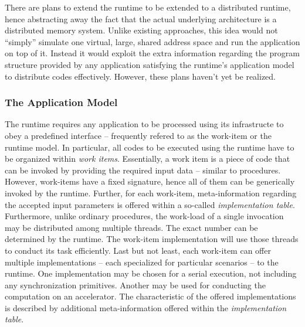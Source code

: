 There
are plans to extend the runtime to be extended to a distributed runtime, hence
abstracting away the fact that the actual underlying architecture is a
distributed memory system. Unlike existing approaches, this idea would not
``simply'' simulate one virtual, large, shared address space and run the
application on top of it. Instead it would exploit the extra information
regarding the program structure provided by any application satisfying the
runtime's application model to distribute codes effectively. However, these
plans haven't yet be realized.


\subsubsection{The Application Model} \label{sec:Overview.Runtime.AppModel}
The runtime requires any application to be processed using its infrastructe to
obey a predefined interface -- frequently refered to as the work-item or the
runtime model. In particular, all codes to be executed using the runtime have to
be organized within \textit{work items}.  Essentially, a work
item is a piece of code that can be invoked by providing the required input data
-- similar to procedures. However, work-items have a fixed signature, hence all
of them can be generically invoked by the runtime. Further, for each work-item,
meta-information regarding the accepted input parameters is offered within a
so-called \textit{implementation table}. Furthermore, unlike ordinary
procedures, the work-load of a single invocation may be distributed among
multiple threads. The exact number can be determined by the runtime. The work-item implementation will use those threads to conduct its task efficiently. Last but not least, each work-item can offer multiple implementations -- each specialized for particular scenarios -- to the runtime. One implementation may be chosen for a serial execution, not including any synchronization primitives. Another may be used for conducting the computation on an accelerator. The characteristic of the offered implementations is described by additional meta-information offered within the \textit{implementation table}.

